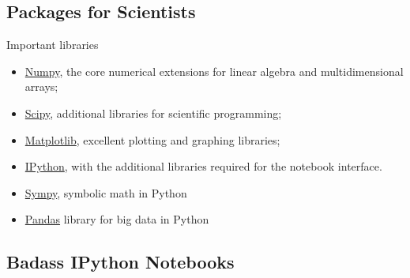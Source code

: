 \documentclass{article}
\begin{document}
\subsection{Packages for Scientists}\label{packages-for-scientists}

Important libraries

\begin{itemize}
\itemsep1pt\parskip0pt
\item
  \href{http://www.numpy.org}{Numpy}, the core numerical extensions for
  linear algebra and multidimensional arrays;
\item
  \href{http://www.scipy.org}{Scipy}, additional libraries for
  scientific programming;
\item
  \href{http://matplotlib.sf.net}{Matplotlib}, excellent plotting and
  graphing libraries;
\item
  \href{http://ipython.org}{IPython}, with the additional libraries
  required for the notebook interface.
\item
  \href{http://sympy.org}{Sympy}, symbolic math in Python
\item
  \href{http://pandas.pydata.org/}{Pandas} library for big data in
  Python
\end{itemize}

\subsection{Badass IPython Notebooks}\label{badass-ipython-notebooks}
\end{document}

